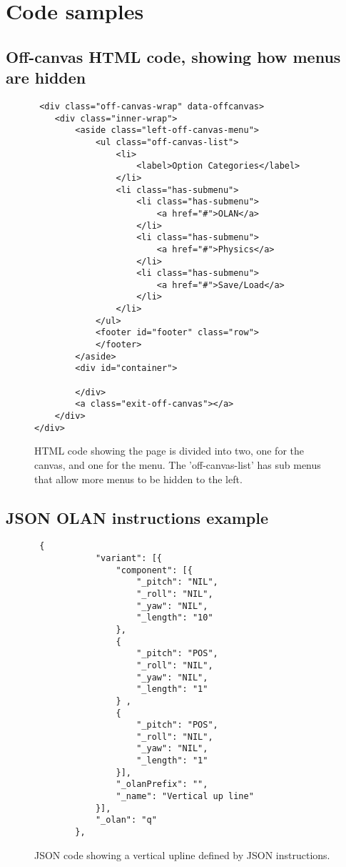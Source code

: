 \chapter{Code samples}

\section{Off-canvas HTML code, showing how menus are hidden }
\label{code:canvas}
\begin{figure}[h!]
\caption{HTML code showing the page is divided into two, one for the canvas, and one for the menu. The 'off-canvas-list' has sub menus that allow more menus to be hidden to the left.}
\begin{lstlisting}
 <div class="off-canvas-wrap" data-offcanvas>
    <div class="inner-wrap">
        <aside class="left-off-canvas-menu">
            <ul class="off-canvas-list">
                <li>
                    <label>Option Categories</label>
                </li>
                <li class="has-submenu">
                    <li class="has-submenu">
                        <a href="#">OLAN</a>
                    </li>
                    <li class="has-submenu">
                        <a href="#">Physics</a>
                    </li>
                    <li class="has-submenu">
                        <a href="#">Save/Load</a>
                    </li>
                </li>
            </ul>
            <footer id="footer" class="row">
            </footer>
        </aside>
        <div id="container">
            
        </div>
        <a class="exit-off-canvas"></a>
    </div>
</div>
\end{lstlisting}
\end{figure}

\section{JSON OLAN instructions example}
\label{code:jsonmoves}
\begin{figure}[h!]
\caption{JSON code showing a vertical upline defined by JSON instructions.}
\begin{lstlisting}
 {
            "variant": [{
                "component": [{
                    "_pitch": "NIL",
                    "_roll": "NIL",
                    "_yaw": "NIL",
                    "_length": "10"
                },
                {
                    "_pitch": "POS",
                    "_roll": "NIL",
                    "_yaw": "NIL",
                    "_length": "1"
                } ,
                {
                    "_pitch": "POS",
                    "_roll": "NIL",
                    "_yaw": "NIL",
                    "_length": "1"
                }],
                "_olanPrefix": "",
                "_name": "Vertical up line"
            }],
            "_olan": "q"
        },
\end{lstlisting}
\end{figure}

